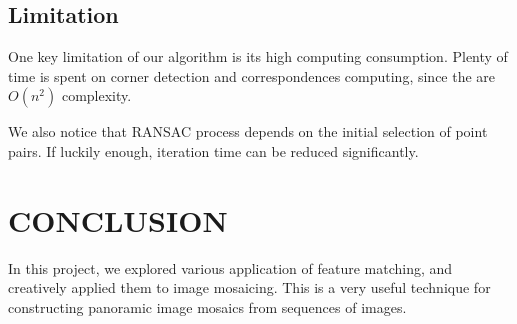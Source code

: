 \documentclass[letterpaper, 10 pt, conference]{ieeeconf}
\begin{document}
\subsection{Limitation}
One key limitation of our algorithm is its high computing consumption. Plenty of time is spent on corner detection and correspondences computing, since the are $O(n^2)$ complexity.

We also notice that RANSAC process depends on the initial selection of point pairs. If luckily enough, iteration time can be reduced significantly.

\section{CONCLUSION}
In this project, we explored various application of feature matching, and creatively applied them to image mosaicing. This is a very useful technique for constructing panoramic image mosaics from sequences of images.
\vfill
\end{document}
